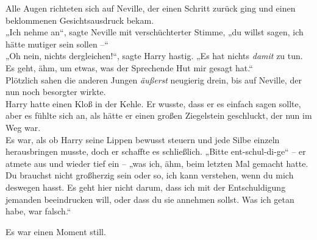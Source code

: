 {Alle Augen richteten sich auf Neville, der einen Schritt zurück ging und einen beklommenen Gesichtsausdruck bekam.\\ „Ich nehme an“, sagte Neville mit verschüchterter Stimme, „du willst sagen, ich hätte mutiger sein sollen --“\\ „Oh nein, nichts dergleichen!“, sagte Harry hastig. „Es hat nichts \emph{damit} zu tun. Es geht, ähm, um etwas, was der Sprechende Hut mir gesagt hat.“\\ Plötzlich sahen die anderen Jungen \emph{äußerst} neugierig drein, bis auf Neville, der nun noch besorgter wirkte.\\ Harry hatte einen Kloß in der Kehle. Er wusste, dass er es einfach sagen sollte, aber es fühlte sich an, als hätte er einen großen Ziegelstein geschluckt, der nun im Weg war.\\ Es war, als ob Harry seine Lippen bewusst steuern und jede Silbe einzeln herausbringen musste, doch er schaffte es schließlich. „Bitte ent-schul-di-ge“ -- er atmete aus und wieder tief ein -- „was ich, ähm, beim letzten Mal gemacht hatte. Du brauchst nicht großherzig sein oder so, ich kann verstehen, wenn du mich deswegen hasst. Es geht hier nicht darum, dass ich mit der Entschuldigung jemanden beeindrucken will, oder dass du sie annehmen sollst. Was ich getan habe, war falsch.“

Es war einen Moment still.

}
